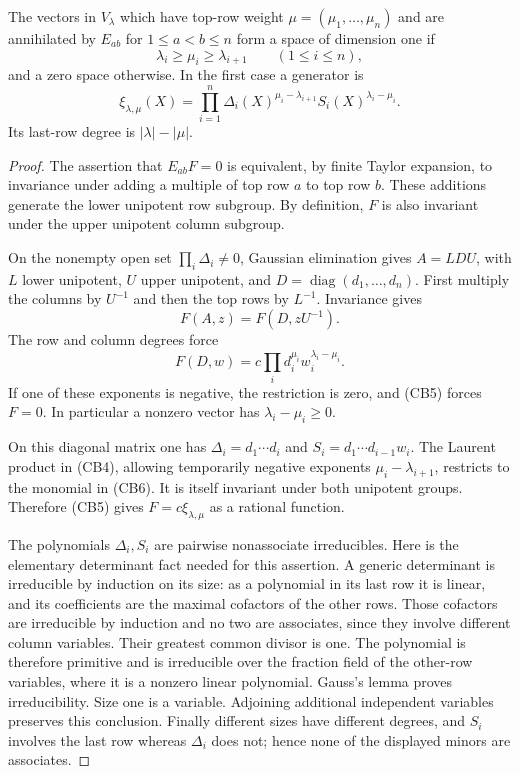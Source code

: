 \begin{lemma}\label{cb-joint-highest}
The vectors in $V_\lambda$ which have top-row weight
$\mu=(\mu_1,\ldots,\mu_n)$ and are annihilated by
$E_{ab}$ for $1\le a<b\le n$ form a space of dimension
one if
\[
                  \lambda_i\ge\mu_i\ge\lambda_{i+1}
                                      \qquad(1\le i\le n),
 \tag{CB3}
\]
and a zero space otherwise.  In the first case a generator is
\[
 \xi_{\lambda,\mu}(X)
       =\prod_{i=1}^n\Delta_i(X)^{\mu_i-\lambda_{i+1}}
                           S_i(X)^{\lambda_i-\mu_i}.
 \tag{CB4}
\]
Its last-row degree is $|\lambda|-|\mu|$.
\end{lemma}
\begin{proof}
The assertion that $E_{ab}F=0$ is equivalent, by finite
Taylor expansion, to invariance under adding a multiple
of top row $a$ to top row $b$.  These additions generate
the lower unipotent row subgroup.  By definition, $F$
is also invariant under the upper unipotent column subgroup.

On the nonempty open set $\prod_i\Delta_i\ne0$, Gaussian
elimination gives $A=LDU$, with $L$ lower unipotent,
$U$ upper unipotent, and $D=\operatorname{diag}(d_1,\ldots,d_n)$.
First multiply the columns by $U^{-1}$ and then the top
rows by $L^{-1}$.  Invariance gives
\[
                         F(A,z)=F(D,zU^{-1}).
 \tag{CB5}
\]
The row and column degrees force
\[
 F(D,w)=c\prod_i d_i^{\mu_i}w_i^{\lambda_i-\mu_i}.
 \tag{CB6}
\]
If one of these exponents is negative, the restriction is
zero, and (CB5) forces $F=0$.  In particular a nonzero
vector has $\lambda_i-\mu_i\ge0$.

On this diagonal matrix one has
$\Delta_i=d_1\cdots d_i$ and
$S_i=d_1\cdots d_{i-1}w_i$.  The Laurent product in
(CB4), allowing temporarily negative exponents
$\mu_i-\lambda_{i+1}$, restricts to the monomial in
(CB6).  It is itself invariant under both unipotent
groups.  Therefore (CB5) gives $F=c\xi_{\lambda,\mu}$
as a rational function.

The polynomials $\Delta_i,S_i$ are pairwise nonassociate
irreducibles.  Here is the elementary determinant fact
needed for this assertion.  A generic determinant is
irreducible by induction on its size: as a polynomial
in its last row it is linear, and its coefficients are
the maximal cofactors of the other rows.  Those cofactors
are irreducible by induction and no two are associates,
since they involve different column variables.  Their
greatest common divisor is one.  The polynomial is
therefore primitive and is irreducible over the fraction
field of the other-row variables, where it is a nonzero
linear polynomial.  Gauss's lemma proves irreducibility.
Size one is a variable.  Adjoining additional independent
variables preserves this conclusion.  Finally different
sizes have different degrees, and $S_i$ involves the last
row whereas $\Delta_i$ does not; hence none of the
displayed minors are associates.


\end{proof}
